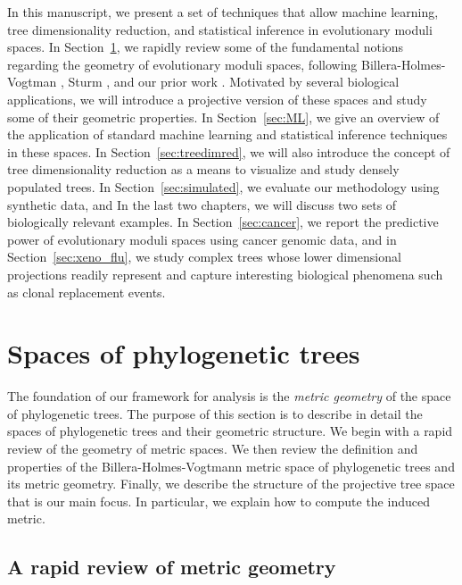 \documentclass[a4paper,11pt]{article}
\begin{document}
In this manuscript, we present a set of techniques that allow machine learning, tree dimensionality reduction, and statistical inference in evolutionary moduli spaces.
In Section~\ref{sec:phylospace}, we rapidly review some of the fundamental notions regarding the geometry of evolutionary moduli spaces, following Billera-Holmes-Vogtman \cite{billera2001geometry}, Sturm \cite{sturm2003probability}, and our prior work \cite{zairis2014moduli}.
Motivated by several biological applications, we will introduce a projective version of these spaces and study some of their geometric properties.
In Section~\ref{sec:ML}, we give an overview of the application of standard machine learning and statistical inference techniques in these spaces.
In Section~\ref{sec:treedimred}, we will also introduce the concept of tree dimensionality reduction as a means to visualize and study densely populated trees.
In Section~\ref{sec:simulated}, we evaluate our methodology using synthetic data, and In the last two chapters, we will discuss two sets of biologically relevant examples.
In Section~\ref{sec:cancer}, we report the predictive power of evolutionary moduli spaces using cancer genomic data, and in Section~\ref{sec:xeno_flu}, we study complex trees whose lower dimensional projections readily represent and capture interesting biological phenomena such as clonal replacement events.



\section{Spaces of phylogenetic trees}\label{sec:phylospace}

The foundation of our framework for analysis is the {\em metric geometry} of the space of phylogenetic trees.
The purpose of this section is to describe in detail the spaces of phylogenetic trees and their geometric structure.
We begin with a rapid review of the geometry of metric spaces.
We then review the definition and properties of the Billera-Holmes-Vogtmann metric space of phylogenetic trees and its metric geometry.
Finally, we describe the structure of the projective tree space that is our main focus.
In particular, we explain how to compute the induced metric.

\subsection{A rapid review of metric geometry}
\end{document}

